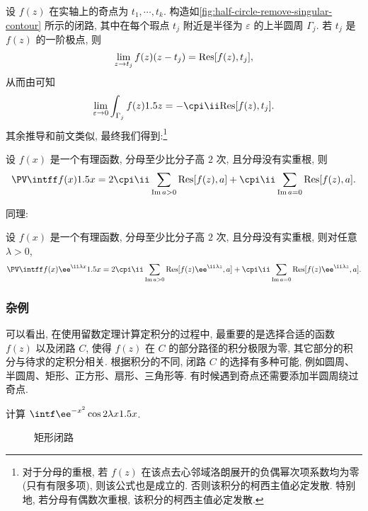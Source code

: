 设 $f(z)$ 在实轴上的奇点为 $t_1,\cdots,t_k$.
构造如\ref{fig:half-circle-remove-singular-contour} 所示的闭路, 其中在每个瑕点 $t_j$ 附近是半径为 $\varepsilon$ 的上半圆周 $\Gamma_j$.
若 $t_j$ 是 $f(z)$ 的一阶极点, 则
\[
  \lim_{z\rightarrow t_j}f(z)(z-t_j)={\mathrm{Res}}[f(z),t_j],
\]
从而由\thmsa 可知
\[
  \lim_{\varepsilon\ra 0}\int_{\Gamma_j}f(z)\d z
  =-\cpi\ii\Res[f(z),t_j].
\]
其余推导和前文类似, 最终我们得到:\footnote{
  对于分母的重根, 若 $f(z)$ 在该点去心邻域洛朗展开的负偶幂次项系数均为零(只有有限多项), 则该公式也是成立的.
  否则该积分的柯西主值必定发散.
  特别地, 若分母有偶数次重根, 该积分的柯西主值必定发散.
}

\begin{theorem}
  设 $f(x)$ 是一个有理函数, 分母至少比分子高 $2$ 次, 且分母没有实重根, 则
  \[
     \PV\intff f(x)\d x
    =2\cpi\ii\sum_{\Im a>0}\Res[f(z),a]
    +\cpi\ii\sum_{\Im a=0}\Res[f(z),a].
  \]
\end{theorem}
同理:
\begin{theorem}
  设 $f(x)$ 是一个有理函数, 分母至少比分子高 $2$ 次, 且分母没有实重根, 则对任意 $\lambda>0$,
  \[
     \PV\intff f(x)\ee^{\ii \lambda x}\d x
    =2\cpi\ii\sum_{\Im a>0}\Res[f(z)\ee^{\ii \lambda z},a]
    +\cpi\ii\sum_{\Im a=0}\Res[f(z)\ee^{\ii \lambda z},a].
  \]
\end{theorem}


\subsubsection{杂例}

可以看出, 在使用留数定理计算定积分的过程中, 最重要的是选择合适的函数 $f(z)$ 以及闭路 $C$, 使得 $f(z)$ 在 $C$ 的部分路径的积分极限为零, 其它部分的积分与待求的定积分相关.
根据积分的不同, 闭路 $C$ 的选择有多种可能, 例如圆周、半圆周、矩形、正方形、扇形、三角形等.
有时候遇到奇点还需要添加半圆周绕过奇点.

\begin{example}
  计算 $\intf\ee^{-x^2}\cos{2\lambda x}\d x$.
\end{example}

\begin{figure}[!htb]
  \centering
  \caption{矩形闭路}
  \label{fig:rectangle-contour}
\end{figure}

